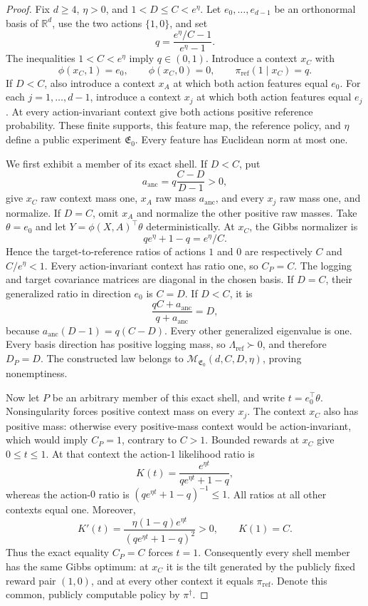 \documentclass{article}
\begin{document}
\begin{proof}
Fix \(d\ge4\), \(\eta>0\), and \(1<D\le C<e^\eta\). Let \(e_0,\ldots,e_{d-1}\) be an orthonormal basis of \(\mathbb R^d\), use the two actions \(\{1,0\}\), and set
\[
q=\frac{e^\eta/C-1}{e^\eta-1}.
\]
The inequalities \(1<C<e^\eta\) imply \(q\in(0,1)\). Introduce a context \(x_C\) with
\[
\phi(x_C,1)=e_0,\qquad \phi(x_C,0)=0,\qquad
\pi_{\mathrm{ref}}(1\mid x_C)=q.
\]
If \(D<C\), also introduce a context \(x_A\) at which both action features equal \(e_0\). For each \(j=1,\ldots,d-1\), introduce a context \(x_j\) at which both action features equal \(e_j\). At every action-invariant context give both actions positive reference probability. These finite supports, this feature map, the reference policy, and \(\eta\) define a public experiment \(\mathfrak E_0\). Every feature has Euclidean norm at most one.

We first exhibit a member of its exact shell. If \(D<C\), put
\[
a_{\mathrm{anc}}=q\frac{C-D}{D-1}>0,
\]
give \(x_C\) raw context mass one, \(x_A\) raw mass \(a_{\mathrm{anc}}\), and every \(x_j\) raw mass one, and normalize. If \(D=C\), omit \(x_A\) and normalize the other positive raw masses. Take \(\theta=e_0\) and let \(Y=\phi(X,A)^\top\theta\) deterministically. At \(x_C\), the Gibbs normalizer is
\[
qe^\eta+1-q=e^\eta/C.
\]
Hence the target-to-reference ratios of actions \(1\) and \(0\) are respectively \(C\) and \(C/e^\eta<1\). Every action-invariant context has ratio one, so \(C_P=C\). The logging and target covariance matrices are diagonal in the chosen basis. If \(D=C\), their generalized ratio in direction \(e_0\) is \(C=D\). If \(D<C\), it is
\[
\frac{qC+a_{\mathrm{anc}}}{q+a_{\mathrm{anc}}}=D,
\]
because \(a_{\mathrm{anc}}(D-1)=q(C-D)\). Every other generalized eigenvalue is one. Every basis direction has positive logging mass, so \(\Lambda_{\mathrm{ref}}\succ0\), and therefore \(D_P=D\). The constructed law belongs to \(\mathcal M_{\mathfrak E_0}(d,C,D,\eta)\), proving nonemptiness.

Now let \(P\) be an arbitrary member of this exact shell, and write \(t=e_0^\top\theta\). Nonsingularity forces positive context mass on every \(x_j\). The context \(x_C\) also has positive mass: otherwise every positive-mass context would be action-invariant, which would imply \(C_P=1\), contrary to \(C>1\). Bounded rewards at \(x_C\) give \(0\le t\le1\). At that context the action-\(1\) likelihood ratio is
\[
K(t)=\frac{e^{\eta t}}{qe^{\eta t}+1-q},
\]
whereas the action-\(0\) ratio is \((qe^{\eta t}+1-q)^{-1}\le1\). All ratios at all other contexts equal one. Moreover,
\[
K'(t)=\frac{\eta(1-q)e^{\eta t}}{(qe^{\eta t}+1-q)^2}>0,
\qquad K(1)=C.
\]
Thus the exact equality \(C_P=C\) forces \(t=1\). Consequently every shell member has the same Gibbs optimum: at \(x_C\) it is the tilt generated by the publicly fixed reward pair \((1,0)\), and at every other context it equals \(\pi_{\mathrm{ref}}\). Denote this common, publicly computable policy by \(\pi^\dagger\).


\end{proof}
\end{document}
